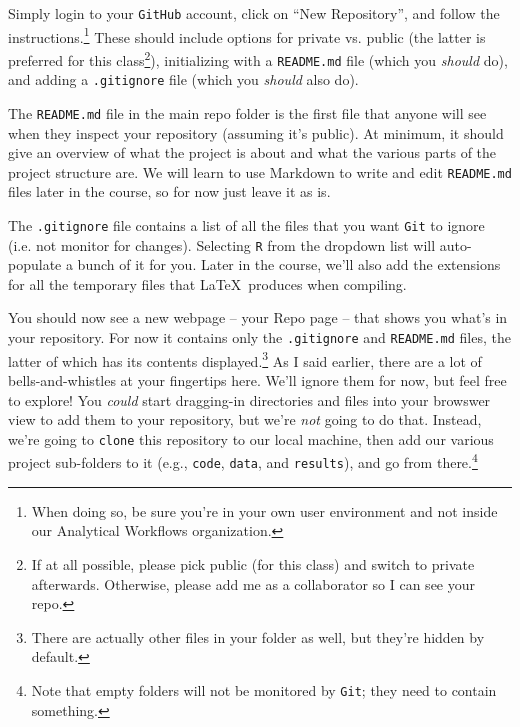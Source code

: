 \documentclass[12pt,letterpaper]{article}
\begin{document}
Simply login to your \texttt{GitHub} account, click on ``New Repository'', and 
follow the instructions.\footnote{When doing so, be sure you're in your own user 
environment and not inside our Analytical Workflows organization.}
These should include options for private vs. public (the latter is preferred for this class\footnote{If at all possible, please pick public (for this class) and switch to private afterwards.  Otherwise, please add me as a collaborator so I can see your repo.}), initializing with a \texttt{README.md} file (which you \emph{should} do), and adding a \texttt{.gitignore} file (which you \emph{should} also do).

The \texttt{README.md} file in the main repo folder is the first file that anyone will see when they inspect your repository (assuming it's public).
At minimum, it should give an overview of what the project is about and what the various parts of the project structure are.
We will learn to use Markdown to write and edit \texttt{README.md} files later in the course, so for now just leave it as is.

The \texttt{.gitignore} file contains a list of all the files that you want \texttt{Git} to ignore (i.e. not monitor for changes).
Selecting \texttt{R} from the dropdown list will auto-populate a bunch of it for you.
Later in the course, we'll also add the extensions for all the temporary files that \LaTeX\ produces when compiling.

You should now see a new webpage -- your Repo page -- that shows you what's in your repository.
For now it contains only the \texttt{.gitignore} and \texttt{README.md} files, the 
latter of which has its contents displayed.\footnote{There are actually other files 
in your folder as well, but they're hidden by default.}
As I said earlier, there are a lot of bells-and-whistles at your fingertips here.
We'll ignore them for now, but feel free to explore!
You \emph{could} start dragging-in directories and files into your browswer view to add them to your repository, but we're \emph{not} going to do that.
Instead, we're going to \texttt{clone} this repository to our local machine, then add our various project sub-folders to it (e.g., \texttt{code}, \texttt{data}, and \texttt{results}), and go from there.\footnote{Note that empty folders will not be monitored by \texttt{Git}; they need to contain something.}
\end{document}
